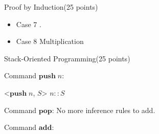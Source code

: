 \documentclass{article}
\begin{document}
\begin{question}{Proof by Induction}{(25 points)}
\begin{subquestion}
\begin{itemize}
\item Case 7 .

\item Case 8 Multiplication 

\end{itemize}
    
  \end{subquestion}

\end{question}





%
%
%

\newpage
\begin{question}{Stack-Oriented Programming}{(25 points)}

\newcommand{\push}[1]{\ensuremath{\mathbf{push}\;#1}}
\newcommand{\add}{\ensuremath{\mathbf{add}}}
\newcommand{\mul}{\ensuremath{\mathbf{mul}}}
\newcommand{\divcom}{\ensuremath{\mathbf{div}}}
\newcommand{\pop}{\ensuremath{\mathbf{pop}}}
\newcommand{\dup}{\ensuremath{\mathbf{dup}}}
\newcommand{\swap}[1]{\ensuremath{\mathbf{swap}\;{#1}}}
\newcommand{\seq}[2]{\ensuremath{#1; #2}}
\renewcommand{\skip}{\ensuremath{\mathbf{skip}}}
\newcommand{\WHILENE}{\ensuremath{\mathbf{whilene}}\xspace}
\newcommand{\whilene}[1]{\ensuremath{\WHILENE\;\{#1\}}}
\newcommand{\emptystack}{\ensuremath{[]}}
\newcommand{\stack}{\ensuremath{S}}
\newcommand{\cons}[2]{\ensuremath{#1 :: #2}}




  \begin{subquestion}
    \begin{subsubquestion}
      Command $\push{n}$: 
      
      \infrule[PUSH]
      {
      	
      }
      {
      	<$\push n$, $\stack$> \stepsto $\cons{n}{S}$
      }
      {
      }
    \end{subsubquestion}
    \begin{subsubquestion}
      Command $\pop$: No more inference rules to add.
    \end{subsubquestion}
    \begin{subsubquestion}
      Command $\add$:
      

\end{subsubquestion}
\end{subquestion}
\end{question}
\end{document}
